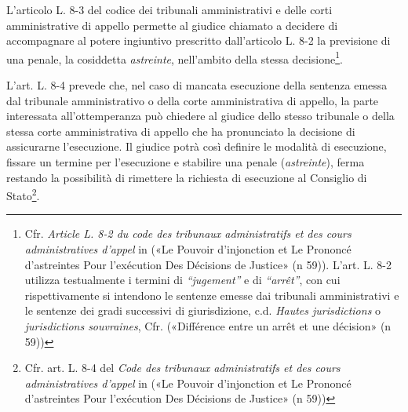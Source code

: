 \documentclass[12pt,it,a4paper,]{report}
\begin{document}
L'articolo L. 8-3 del codice dei tribunali amministrativi e delle corti
amministrative di appello permette al giudice chiamato a decidere di
accompagnare al potere ingiuntivo prescritto dall'articolo L. 8-2 la
previsione di una penale, la cosiddetta \emph{astreinte}, nell'ambito
della stessa decisione\footnote{Cfr. \emph{Article L. 8-2 du code des
  tribunaux administratifs et des cours administratives d'appel} in
  ({«Le Pouvoir d'injonction et Le Prononcé d'astreintes Pour
  l'exécution Des Décisions de Justice»} (n 59)). L'art. L. 8-2 utilizza
  testualmente i termini di \emph{``jugement''} e di \emph{``arrêt''},
  con cui rispettivamente si intendono le sentenze emesse dai tribunali
  amministrativi e le sentenze dei gradi successivi di giurisdizione,
  c.d. \emph{Hautes jurisdictions} o \emph{jurisdictions souvraines},
  Cfr. ({«Différence entre un arrêt et une décision»} (n 59))}.

L'art. L. 8-4 prevede che, nel caso di mancata esecuzione della sentenza
emessa dal tribunale amministrativo o della corte amministrativa di
appello, la parte interessata all'ottemperanza può chiedere al giudice
dello stesso tribunale o della stessa corte amministrativa di appello
che ha pronunciato la decisione di assicurarne l'esecuzione. Il giudice
potrà così definire le modalità di esecuzione, fissare un termine per
l'esecuzione e stabilire una penale (\emph{astreinte}), ferma restando
la possibilità di rimettere la richiesta di esecuzione al Consiglio di
Stato\footnote{Cfr. art. L. 8-4 del \emph{Code des tribunaux
  administratifs et des cours administratives d'appel} in ({«Le Pouvoir
  d'injonction et Le Prononcé d'astreintes Pour l'exécution Des
  Décisions de Justice»} (n 59))}.
\end{document}
